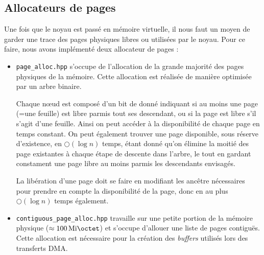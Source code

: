 \documentclass[french, 12pt]{article}
\begin{document}

\subsection{Allocateurs de pages}
Une fois que le noyau est passé en mémoire virtuelle, il nous faut un moyen
de garder une trace des pages physiques libres ou utilisées par le noyau. Pour
ce faire, nous avons implémenté deux allocateur de pages :
\begin{itemize}
    \item \texttt{page\_alloc.hpp} s'occupe de l'allocation de la grande
          majorité des pages physiques de la mémoire. Cette allocation est
          réalisée de manière optimisée par un arbre binaire. 

          Chaque nœud est composé d'un bit de donné indiquant si au moins une
          page (=une feuille) est libre parmis tout ses descendant, ou si la page 
          est libre s'il s'agit d'une feuille. Ainsi on peut accéder à la disponibilité
          de chaque page en temps constant. On peut également trouver une page disponible, 
          sous réserve d'existence, en $\bigcirc (\log n)$ temps, étant donné qu'on élimine 
          la moitié des page existantes à chaque étape de descente dans l'arbre, 
          le tout en gardant constament une page libre au moins parmis les descendants 
          envisagés. 
          
          La libération d'une page doit se faire en modifiant les ancêtre 
          nécessaires pour prendre en compte la disponibilité de la page, donc en au plus 
          $\bigcirc (\log n)$ temps également. 

    \item \texttt{contiguous\_page\_alloc.hpp} travaille sur une petite portion
          de la mémoire physique ($\approx \SI{100}{\mebi\octet}$) et s'occupe
          d'allouer une liste de pages contiguës. Cette allocation est
          nécessaire pour la création des \textit{buffers} utilisés lors des
          transferts DMA.
\end{itemize}
\end{document}

